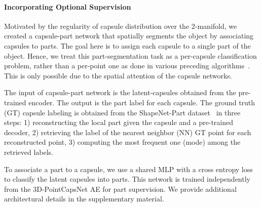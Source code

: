 \documentclass[10pt,twocolumn,letterpaper]{article}
\theoremstyle{break}
\begin{document}
\paragraph{Incorporating Optional Supervision}
Motivated by the regularity of capsule distribution over the 2-manifold, we created a capsule-part network that spatially segments the object by associating capsules to parts. The goal here is to assign each capsule to a single part of the object. Hence, we treat this part-segmentation task as a per-capsule classification problem, rather than a per-point one as done in various preceding algorithms~\cite{qi2017pointnet,Qi2017PointNetDH}. This is only possible due to the spatial attention of the capsule networks.

The input of capsule-part network is the latent-capsules obtained from the pre-trained encoder. The output is the part label for each capsule. The ground truth (GT) capsule labeling is obtained from the ShapeNet-Part dataset~\cite{yi2016scalable} in three steps: 1) reconstructing the local part given the capsule and a pre-trained decoder, 2) retrieving the label of the nearest neighbor (NN) GT point for each reconstructed point, 3) computing the most frequent one (mode) among the retrieved labels.

To associate a part to a capsule, we use a shared MLP with a cross entropy loss to classify the latent capsules into parts. This network is trained independently from the 3D-PointCapsNet AE for part supervision. We provide additional architectural details in the supplementary material.
\end{document}
